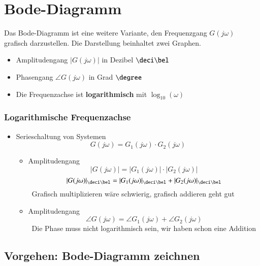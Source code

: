 \section{Bode-Diagramm}

Das Bode-Diagramm ist eine weitere Variante, den Frequenzgang $G(j \omega)$ grafisch darzustellen.
Die Darstellung beinhaltet zwei Graphen.

\begin{itemize}
    \item Amplitudengang $|G(j \omega)|$ in Dezibel $\deci \bel$
    \item Phasengang $\angle G(j \omega)$ in Grad $\degree$
    \item Die Frequenzachse ist \textbf{logarithmisch} mit $\log_{10}(\omega)$
\end{itemize}


\subsubsection{Logarithmische Frequenzachse}

\begin{itemize}
    \item Serieschaltung von Systemen
        $$ G(j \omega) = G_1(j \omega) \cdot G_2(j \omega) $$

    \begin{itemize}
        \item Amplitudengang
            $$ |G(j \omega)| = |G_1(j \omega)| \cdot |G_2(j \omega)| $$
            $$ |G(j \omega)|_{\deci \bel} = |G_1(j \omega)|_{\deci \bel} + |G_2(j \omega)|_{\deci \bel} $$
            \textrightarrow\ Grafisch multiplizieren wäre schwierig, grafisch addieren geht gut
    \end{itemize}

    \begin{itemize}
        \item Amplitudengang
            $$ \angle G(j \omega) = \angle G_1(j \omega) +  \angle G_2(j \omega) $$
            \textrightarrow\ Die Phase muss nicht logarithmisch sein, wir haben schon eine Addition 
    \end{itemize}
\end{itemize}


\subsection{Vorgehen: Bode-Diagramm zeichnen}

